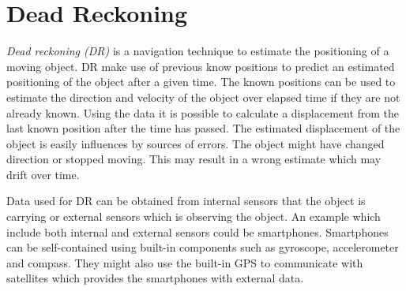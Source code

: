 \section{Dead Reckoning}
\textit{Dead reckoning (DR)} \cite{DR} is a navigation technique to estimate the positioning of a moving object.
DR make use of previous know positions to predict an estimated positioning of the object after a given time.
The known positions can be used to estimate the direction and velocity of the object over elapsed time if they are not already known.
Using the data it is possible to calculate a displacement from the last known position after the time has passed.
The estimated displacement of the object is easily influences by sources of errors.
The object might have changed direction or stopped moving.
This may result in a wrong estimate which may drift over time.

Data used for DR can be obtained from internal sensors that the object is carrying or external sensors which is observing the object.
An example which include both internal and external sensors could be smartphones.
Smartphones can be self-contained using built-in components such as gyroscope, accelerometer and compass.
They might also use the built-in GPS to communicate with satellites which provides the smartphones with external data.